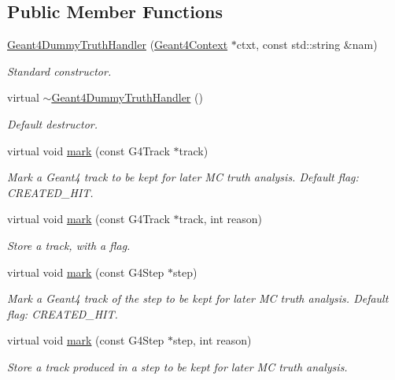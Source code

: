 \subsection*{Public Member Functions}
\begin{DoxyCompactItemize}
\item 
\hyperlink{class_d_d4hep_1_1_simulation_1_1_geant4_dummy_truth_handler_a5c401a9e0de83670c8e61da169bdd56e}{Geant4\+Dummy\+Truth\+Handler} (\hyperlink{class_d_d4hep_1_1_simulation_1_1_geant4_context}{Geant4\+Context} $\ast$ctxt, const std\+::string \&nam)
\begin{DoxyCompactList}\small\item\em Standard constructor. \end{DoxyCompactList}\item 
virtual \hyperlink{class_d_d4hep_1_1_simulation_1_1_geant4_dummy_truth_handler_ae5c0fe10becfd6ba266b4bbb1b56c253}{$\sim$\+Geant4\+Dummy\+Truth\+Handler} ()
\begin{DoxyCompactList}\small\item\em Default destructor. \end{DoxyCompactList}\item 
virtual void \hyperlink{class_d_d4hep_1_1_simulation_1_1_geant4_dummy_truth_handler_ae7540d20113834f5a31134df344813ad}{mark} (const G4\+Track $\ast$track)
\begin{DoxyCompactList}\small\item\em Mark a Geant4 track to be kept for later MC truth analysis. Default flag\+: C\+R\+E\+A\+T\+E\+D\+\_\+\+H\+IT. \end{DoxyCompactList}\item 
virtual void \hyperlink{class_d_d4hep_1_1_simulation_1_1_geant4_dummy_truth_handler_aa5a1b21c7557cd4dfb314b217fc37a87}{mark} (const G4\+Track $\ast$track, int reason)
\begin{DoxyCompactList}\small\item\em Store a track, with a flag. \end{DoxyCompactList}\item 
virtual void \hyperlink{class_d_d4hep_1_1_simulation_1_1_geant4_dummy_truth_handler_a19f10fada0444ae5f60deb1d92761969}{mark} (const G4\+Step $\ast$step)
\begin{DoxyCompactList}\small\item\em Mark a Geant4 track of the step to be kept for later MC truth analysis. Default flag\+: C\+R\+E\+A\+T\+E\+D\+\_\+\+H\+IT. \end{DoxyCompactList}\item 
virtual void \hyperlink{class_d_d4hep_1_1_simulation_1_1_geant4_dummy_truth_handler_a0387d2cf651a83c45242962f80c41096}{mark} (const G4\+Step $\ast$step, int reason)
\begin{DoxyCompactList}\small\item\em Store a track produced in a step to be kept for later MC truth analysis. \end{DoxyCompactList}\end{DoxyCompactItemize}
